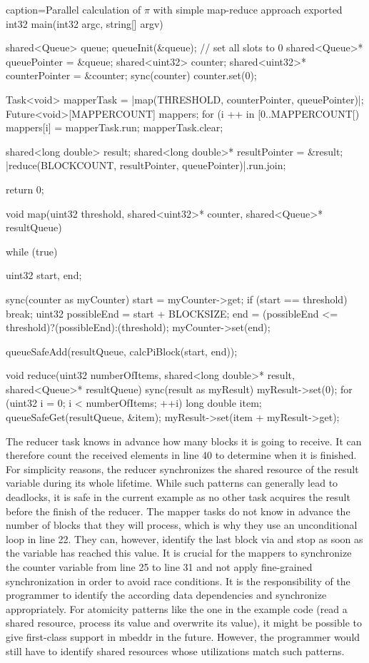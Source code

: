 \begin{ccode}{caption=Parallel calculation of $\pi$ with simple map-reduce approach}
exported int32 main(int32 argc, string[] argv) { 
  shared<Queue> queue; 
  queueInit(&queue);  // set all slots to 0
  shared<Queue>* queuePointer = &queue; 
  shared<uint32> counter; 
  shared<uint32>* counterPointer = &counter; 
  sync(counter) { counter.set(0); } 
   
  Task<void> mapperTask = |map(THRESHOLD, counterPointer, queuePointer)|; 
  Future<void>[MAPPERCOUNT] mappers; 
  for (i ++ in [0..MAPPERCOUNT[) { mappers[i] = mapperTask.run; }
  mapperTask.clear; 
   
  shared<long double> result; 
  shared<long double>* resultPointer = &result;  
  |reduce(BLOCKCOUNT, resultPointer, queuePointer)|.run.join; 
  
  return 0; 
}
 
void map(uint32 threshold, shared<uint32>* counter, shared<Queue>* resultQueue) { 
  while (true) { 
    uint32 start, end; 
     
    sync(counter as myCounter) { 
      start = myCounter->get; 
      if (start == threshold) { break; }
      uint32 possibleEnd = start + BLOCKSIZE; 
      end = (possibleEnd <= threshold)?(possibleEnd):(threshold); 
      myCounter->set(end); 
    } 
     
    queueSafeAdd(resultQueue, calcPiBlock(start, end)); 
  }
}
 
void reduce(uint32 numberOfItems, shared<long double>* result, shared<Queue>* resultQueue) { 
  sync(result as myResult) { 
    myResult->set(0); 
    for (uint32 i = 0; i < numberOfItems; ++i) { 
      long double item; 
      queueSafeGet(resultQueue, &item); 
      myResult->set(item + myResult->get); 
    }
  } 
}
\end{ccode}

The reducer task knows in advance how many blocks it is going to receive. It can therefore count the received elements in line 40 to determine when it is finished. For simplicity reasons, the reducer synchronizes the shared resource of the result variable during its whole lifetime. While such patterns can generally lead to deadlocks, it is safe in the current example as no other task acquires the result before the finish of the reducer. The mapper tasks do not know in advance the number of blocks that they will process, which is why they use an unconditional loop in line 22. They can, however, identify the last block via  and stop as soon as the  variable has reached this value. It is crucial for the mappers to synchronize the counter variable from line 25 to line 31 and not apply fine-grained synchronization in order to avoid race conditions. It is the responsibility of the programmer to identify the according data dependencies and synchronize appropriately. For atomicity patterns like the one in the example code (read a shared resource, process its value and overwrite its value), it might be possible to give first-class support in mbeddr in the future. However, the programmer would still have to identify shared resources whose utilizations match such patterns.

